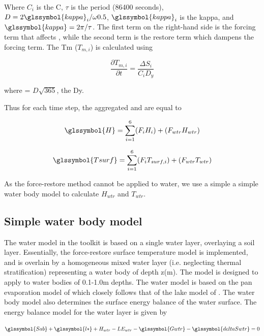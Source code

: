 \documentclass[final,3p,times,authoryear]{elsarticle}
\begin{document}
Where $C_{i}$ is the \glsdesc{C}, $\tau$ is the period (86400 seconds), $D = 2 \glssymbol{kappa} _{i}  / \omega 0.5$, $\glssymbol{kappa} _{i}$ is the \glsdesc{kappa}, and $\glssymbol{kappa} = 2\pi / \tau$.  The first term on the right-hand side is the forcing term that affects , while the second term is the restore term which dampens the forcing term. The \glsdesc{Tm} ($T_{m,i}$) is calculated using

\begin{equation} 
\frac{\partial T_{m,i}}{\partial t} = \frac{\Delta S_{i}}{C_{i} D_{y}}
\label{eq:tm} \end{equation} 

where  = $D \sqrt{365}$, the \glsdesc{Dy}. 

Thus for each time step, the aggregated  and  are equal to

\begin{equation} 
\glssymbol{H} = \sum_{i=1}^{6} (F_{i} H_{i}) + (F_{wtr} H_{wtr})
\label{eq:H} \end{equation} 

\begin{equation} 
\glssymbol{Tsurf} = \sum_{i=1}^{6} (F_{i} T_{surf,i}) + (F_{wtr} T_{wtr})
\label{eq:tsurf} \end{equation} 

As the force-restore method cannot be applied to water, we use a simple a simple water body model to calculate $H_{wtr}$ and $T_{wtr}$.


\subsection{Simple water body model}\label{sec:simplewater}

The water model in the toolkit is based on a single water layer, overlaying a soil layer. Essentially, the force-restore surface temperature model is implemented, and is overlain by a homogeneous mixed water layer (i.e. neglecting thermal stratification) representing a water body of depth z(m). The model is designed to apply to water bodies of 0.1-1.0m depths. The water model is based on the pan evaporation model of \cite{MolinaMartinez2006} which closely follows that of the lake model of \cite{Jacobs1998}. The water body model also determines the surface energy balance of the water surface. The energy balance model for the water layer is given by \citep{MolinaMartinez2006}

\begin{equation} 
\glssymbol{Sab} + \glssymbol{l*} + H_{wtr} - LE_{wtr} - \glssymbol{Gwtr} -\glssymbol{deltaSwtr} = 0
\label{eq:sab} \end{equation} 
\end{document}
